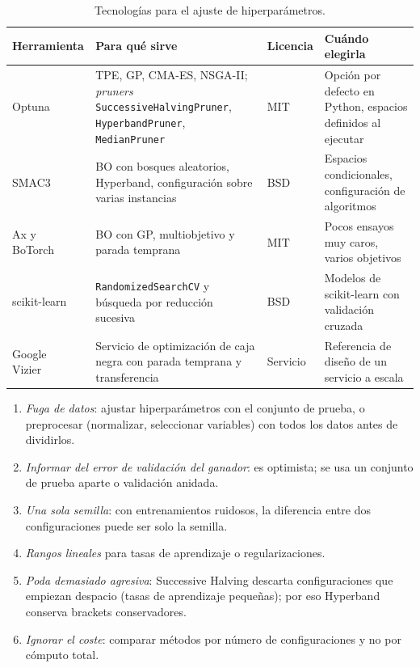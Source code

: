 \begin{table}[ht]
\centering\small
\begin{tabularx}{\textwidth}{@{}>{\raggedright\arraybackslash}p{2.8cm}>{\raggedright\arraybackslash}X>{\raggedright\arraybackslash}p{1.4cm}>{\raggedright\arraybackslash}p{3.5cm}@{}}
\toprule
Herramienta & Para qué sirve & Licencia & Cuándo elegirla \\
\midrule
Optuna~\cite{optuna} & TPE, GP, CMA-ES, NSGA-II; \emph{pruners} \texttt{SuccessiveHalvingPruner}, \texttt{HyperbandPruner}, \texttt{MedianPruner} & MIT & Opción por defecto en Python, espacios definidos al ejecutar \\
SMAC3~\cite{smac3} & BO con bosques aleatorios, Hyperband, configuración sobre varias instancias & BSD & Espacios condicionales, configuración de algoritmos \\
Ax y BoTorch~\cite{ax,botorch} & BO con GP, multiobjetivo y parada temprana & MIT & Pocos ensayos muy caros, varios objetivos \\
scikit-learn & \texttt{RandomizedSearchCV} y búsqueda por reducción sucesiva & BSD & Modelos de scikit-learn con validación cruzada \\
Google Vizier~\cite{vizier} & Servicio de optimización de caja negra con parada temprana y transferencia & Servicio & Referencia de diseño de un servicio a escala \\
\bottomrule
\end{tabularx}
\caption{Tecnologías para el ajuste de hiperparámetros.}
\label{tab:tec6}
\end{table}

\begin{observacion}\label{obs:errores6}
\begin{enumerate}
  \item \emph{Fuga de datos}: ajustar hiperparámetros con el conjunto de prueba, o preprocesar (normalizar, seleccionar variables) con todos los datos antes de dividirlos.
  \item \emph{Informar del error de validación del ganador}: es optimista; se usa un conjunto de prueba aparte o validación anidada.
  \item \emph{Una sola semilla}: con entrenamientos ruidosos, la diferencia entre dos configuraciones puede ser solo la semilla.
  \item \emph{Rangos lineales} para tasas de aprendizaje o regularizaciones.
  \item \emph{Poda demasiado agresiva}: Successive Halving descarta configuraciones que empiezan despacio (tasas de aprendizaje pequeñas); por eso Hyperband conserva brackets conservadores.
  \item \emph{Ignorar el coste}: comparar métodos por número de configuraciones y no por cómputo total.
\end{enumerate}
\end{observacion}

